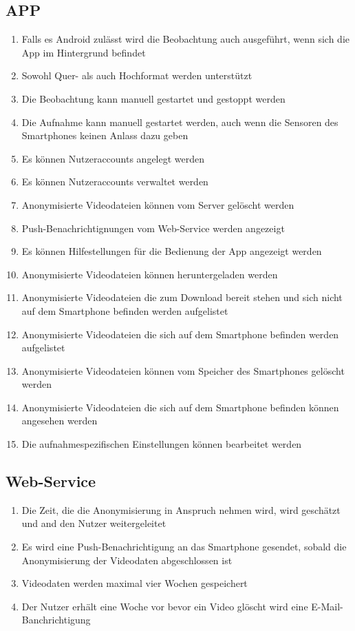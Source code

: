 \subsection{APP}
	\begin{enumerate}[\bfseries{/WK}1010/]
	\item Falls es Android zulässt wird die Beobachtung auch ausgeführt, wenn sich die App im Hintergrund befindet
	\item Sowohl Quer- als auch Hochformat werden unterstützt
	\item Die Beobachtung kann manuell gestartet und gestoppt werden
	\item Die Aufnahme kann manuell gestartet werden, auch wenn die Sensoren des Smartphones keinen Anlass dazu geben
	\item Es können Nutzeraccounts angelegt werden
	\item Es können Nutzeraccounts verwaltet werden
	\item Anonymisierte Videodateien können vom Server gelöscht werden
	\item Push-Benachrichtignungen vom Web-Service werden angezeigt
	\item Es können Hilfestellungen für die Bedienung der App angezeigt werden
	\item Anonymisierte Videodateien können heruntergeladen werden
	\item Anonymisierte Videodateien die zum Download bereit stehen und sich nicht auf dem Smartphone befinden werden aufgelistet
	\item Anonymisierte Videodateien die sich auf dem Smartphone befinden  werden aufgelistet
	\item Anonymisierte Videodateien können vom Speicher des Smartphones gelöscht werden
	\item Anonymisierte Videodateien die sich auf dem Smartphone befinden können angesehen werden
	\item Die aufnahmespezifischen Einstellungen können bearbeitet werden
	\end{enumerate}
\subsection{Web-Service}
	\begin{enumerate}[\bfseries{/WK}2010/]
	\item Die Zeit, die die Anonymisierung in Anspruch nehmen wird, wird geschätzt und and den Nutzer weitergeleitet
	\item Es wird eine Push-Benachrichtigung an das Smartphone gesendet, sobald die Anonymisierung der Videodaten abgeschlossen ist
	\item Videodaten werden maximal vier Wochen gespeichert
	\item Der Nutzer erhält eine Woche vor bevor ein Video glöscht wird eine E-Mail-Banchrichtigung
	\end{enumerate}
